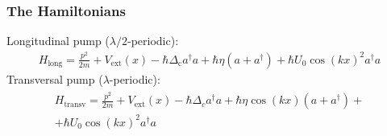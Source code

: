 \documentclass[pdflatex,compress]{beamer}
\begin{document}
\begin{frame}
\frametitle{The Hamiltonians}
Longitudinal pump ($\lambda / 2$-periodic):
\begin{align}
H_\text{long} = \frac{p^2}{2m} + V_\text{ext}(x) - \hbar \Delta_\text{c} a^\dagger a + \hbar \eta (a + a^\dagger) + \hbar U_0 \cos(kx)^2 a^\dagger a
\end{align}Transversal pump ($\lambda$-periodic):
\begin{align}
\begin{split}
H_\text{transv} = \frac{p^2}{2m} + V_\text{ext}(x) - \hbar \Delta_c a^\dagger a + \hbar \eta \cos(kx) (a + a^\dagger) + \\
 + \hbar U_0 \cos(kx)^2 a^\dagger a
\end{split}
\end{align}
\end{frame}
\end{document}
